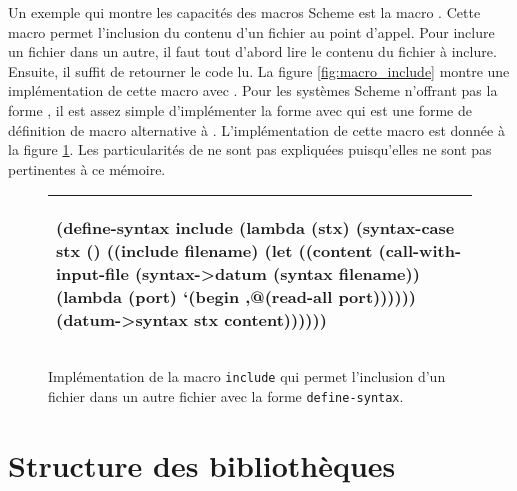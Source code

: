Un exemple qui montre les capacités des macros Scheme est la macro
.  Cette macro permet l'inclusion du contenu d'un fichier au
point d'appel.  Pour inclure un fichier dans un autre, il faut tout d'abord
lire le contenu du fichier à inclure. Ensuite, il suffit de retourner le code
lu. La figure \ref{fig:macro_include} montre une implémentation de cette macro
avec .  Pour les systèmes Scheme n'offrant pas la forme
, il est assez simple d'implémenter la forme
 avec  qui est une forme de définition
de macro alternative à . L'implémentation de cette macro
est donnée à la figure \ref{fig:macro_include_def_syntax}. Les particularités
de  ne sont pas expliquées puisqu'elles ne sont pas
pertinentes à ce mémoire.



\begin{figure}[ht]
\begin{tabular}{|l|}\hline
\begin{mplisting}{0.8}
(define-syntax include
  (lambda (stx)
    (syntax-case stx ()
      ((include filename)
       (let ((content
               (call-with-input-file
                  (syntax->datum (syntax filename))
                  (lambda (port)
                    `(begin ,@(read-all port))))))
         (datum->syntax stx content))))))
\end{mplisting}\\\hline

\end{tabular}
   \caption{Implémentation de la macro \texttt{include} qui permet l'inclusion
   d'un fichier dans un autre fichier avec la forme \texttt{define-syntax}.}

   \label{fig:macro_include_def_syntax}
\end{figure}

\section{Structure des bibliothèques}


